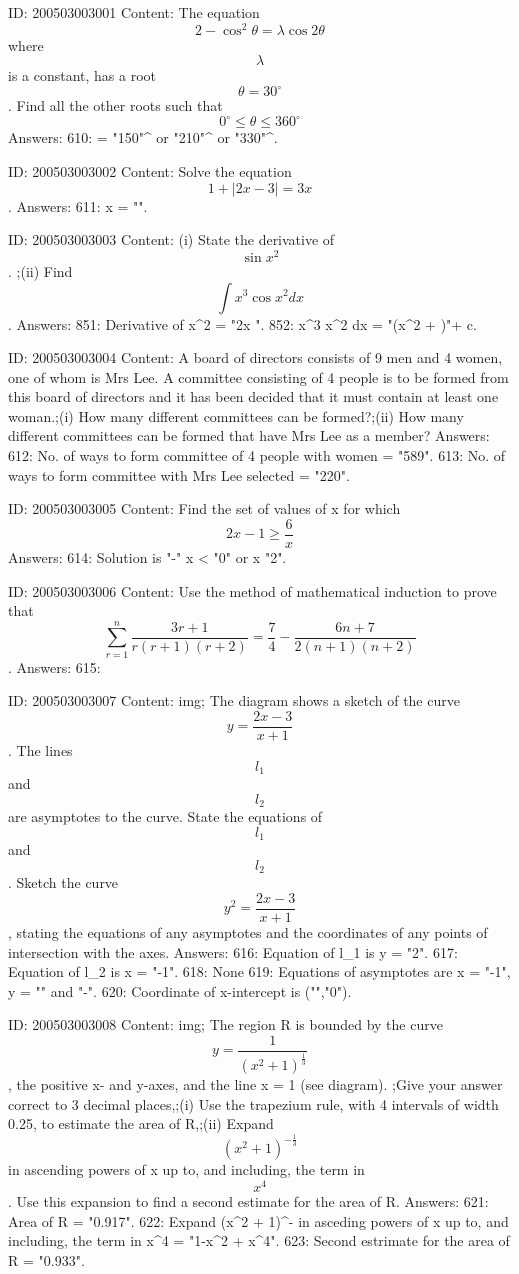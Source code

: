 \documentclass{article}
\begin{document}
ID: 200503003001
Content:
The equation $$2 - {\cos }^2 \theta = \lambda  \cos  2\theta$$ where $$\lambda$$  is a constant, has a root $$\theta = 30^{\circ}$$. Find all the other roots such that $$0^{\circ} \leq \theta \leq 360^{\circ}$$ Answers:
610: \theta = "150"^{\circ} or "210"^{\circ} or "330"^{\circ}.

ID: 200503003002
Content:
Solve the equation $$1+|2x-3|=3x$$. Answers:
611: x = "".

ID: 200503003003
Content:
(i) State the derivative of  $$\sin {x^2}$$.  ;(ii) Find $$\int x^3 \cos { x^2 } dx$$. Answers:
851: Derivative of \sin x^2 = "2x ".
852: \int x^3 \cos x^2 dx = "(x^2  + )"+ c.

ID: 200503003004
Content:
A board of directors consists of 9 men and 4 women, one of whom is Mrs Lee. A committee consisting of 4 people is to be formed from this board of directors and it has been decided that it must contain at least one woman.;(i) How many different committees can be formed?;(ii) How many different committees can be formed that have Mrs Lee as a member? Answers:
612: No. of ways to form committee of 4 people with  women = "589".
613: No. of ways to form committee with Mrs Lee selected = "220".

ID: 200503003005
Content:
Find the set of values of x for which $$2x - 1 \geq \frac{6}{x}$$ Answers:
614: Solution is "-" \leq x < "0" or x \geq "2".

ID: 200503003006
Content:
Use the method of mathematical induction to prove that $$\sum^n_{r = 1} \frac{3r + 1}{r( r + 1 ) ( r + 2 )} = \frac{7}{4} - \frac{6n + 7}{2( n + 1 ) ( n + 2 )}$$. Answers:
615: 

ID: 200503003007
Content:
img; The diagram shows a sketch of the curve $$y = \frac{2x - 3}{x + 1}$$. The lines $$l_1$$ and $$l_2$$ are asymptotes to the curve. State the equations of $$l_1$$ and $$l_2$$. Sketch the curve $$y^2 = \frac{2x - 3}{x + 1}$$, stating the equations of any asymptotes and the coordinates of any points of intersection with the axes. Answers:
616: Equation of l_1 is y = "2".
617: Equation of l_2 is x = "-1".
618: None
619: Equations of asymptotes are x = "-1", y = "" and "-".
620: Coordinate of x-intercept is ("","0").

ID: 200503003008
Content:
img; The region R is bounded by the curve  $$y = \frac{1}{{( x^2 + 1 )}^{\frac{1}{3}}}$$, the positive x- and y-axes, and the line x = 1 (see diagram). ;Give your answer correct to 3 decimal places,;(i) Use the trapezium rule, with 4 intervals of width 0.25, to estimate the area of R,;(ii) Expand $${( x^2 + 1 )}^{- \frac{1}{3}}$$  in ascending powers of x up to, and including, the term in $$x^4$$. Use this expansion to find a second estimate for the area of R. Answers:
621: Area of R = "0.917".
622: Expand (x^2 + 1)^{-} in asceding powers of x up to, and including, the term in x^4 = "1-x^2 + x^4".
623: Second estrimate for the area of R = "0.933".
\end{document}
